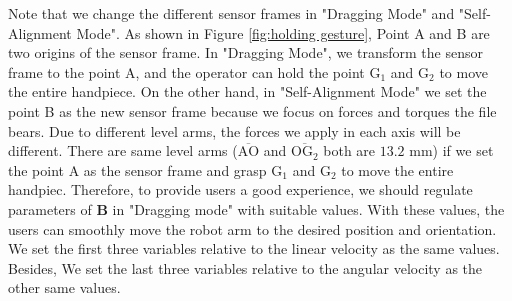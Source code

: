 Note that we change the different sensor frames in "Dragging Mode" and "Self-Alignment Mode". As shown in Figure \ref{fig:holding gesture}, Point A and B are two origins of the sensor frame. In "Dragging Mode", we transform the sensor frame to the point A, and the operator can hold the point $\mathrm{G_1}$ and $\mathrm{G_2}$ to move the entire handpiece. On the other hand, in "Self-Alignment Mode" we set  the point B as the new sensor frame because we focus on forces and torques the file bears. Due to different level arms, the forces we apply in each axis will be different. There are same level arms ($\overline{\mathrm{AO}}$ and $\overline{\mathrm{OG_2}}$ both are $13.2$ mm) if we set the point A as the sensor frame and grasp $\mathrm{G_1}$ and $\mathrm{G_2}$ to move the entire handpiec. Therefore, to provide users a good experience, we should regulate parameters of $\mathbf{B}$ in "Dragging mode" with suitable values. With these values, the users can smoothly move the robot arm to the desired position and orientation. We set the first three variables relative to the linear velocity as the same values. Besides, We set the last three variables relative to the angular velocity as the other same values.
